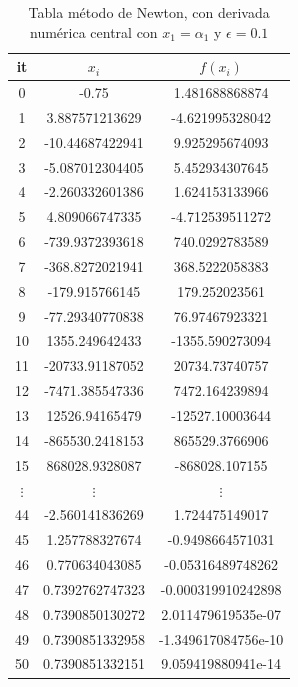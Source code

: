 \documentclass{article} %
\begin{document}
\begin{table}[H]
\centering
\begin{tabular}{|c|c|c|}
\hline
it & $x_i$ & $f(x_i)$\\
\hline
0 & -0.75 & 1.481688868874\\
1 & 3.887571213629 & -4.621995328042\\
2 & -10.44687422941 & 9.925295674093\\
3 & -5.087012304405 & 5.452934307645\\
4 & -2.260332601386 & 1.624153133966\\
5 & 4.809066747335 & -4.712539511272\\
6 & -739.9372393618 & 740.0292783589\\
7 & -368.8272021941 & 368.5222058383\\
8 & -179.915766145 & 179.252023561\\
9 & -77.29340770838 & 76.97467923321\\
10 & 1355.249642433 & -1355.590273094\\
11 & -20733.91187052 & 20734.73740757\\
12 & -7471.385547336 & 7472.164239894\\
13 & 12526.94165479 & -12527.10003644\\
14 & -865530.2418153 & 865529.3766906\\
15 & 868028.9328087 & -868028.107155\\
$\vdots$ & $\vdots$ & $\vdots$\\
44 & -2.560141836269 & 1.724475149017\\
45 & 1.257788327674 & -0.9498664571031\\
46 & 0.770634043085 & -0.05316489748262\\
47 & 0.7392762747323 & -0.000319910242898\\
48 & 0.7390850130272 & 2.011479619535e-07\\
49 & 0.7390851332958 & -1.349617084756e-10\\
50 & 0.7390851332151 & 9.059419880941e-14\\
\hline
\end{tabular}
\caption{Tabla método de Newton, con derivada numérica central con $x_1 = \alpha_1$ y $\epsilon = 0.1$}
\end{table}

\end{document}
